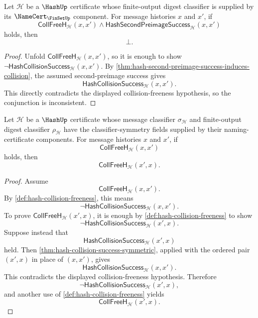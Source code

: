\begin{theorem}
\label{thm:hash-collision-freeness-excludes-second-preimage}
Let $\mathcal H$ be a $\HashUp$ certificate whose finite-output digest classifier is supplied by its $\NameCert_{\FinSetUp}$ component. For message histories $x$ and $x'$, if
$$
\mathsf{CollFreeH}_{\mathcal H}(x,x') \land \mathsf{HashSecondPreimageSuccess}_{\mathcal H}(x,x')
$$
holds, then
$$
\bot.
$$
\end{theorem}
\begin{proof}
Unfold $\mathsf{CollFreeH}_{\mathcal H}(x,x')$, so it is enough to show $\neg\mathsf{HashCollisionSuccess}_{\mathcal H}(x,x')$.
By \autoref{thm:hash-second-preimage-success-induces-collision}, the assumed second-preimage success gives
$$
\mathsf{HashCollisionSuccess}_{\mathcal H}(x,x').
$$
This directly contradicts the displayed collision-freeness hypothesis, so the conjunction is inconsistent.
\end{proof}

\begin{theorem}
\label{thm:hash-collision-freeness-symmetric}
Let $\mathcal H$ be a $\HashUp$ certificate whose message classifier $\sigma_{\mathcal H}$ and finite-output digest classifier $\rho_{\mathcal H}$ have the classifier-symmetry fields supplied by their naming-certificate components. For message histories $x$ and $x'$, if
$$
\mathsf{CollFreeH}_{\mathcal H}(x,x')
$$
holds, then
$$
\mathsf{CollFreeH}_{\mathcal H}(x',x).
$$
\end{theorem}
\begin{proof}
Assume
$$
\mathsf{CollFreeH}_{\mathcal H}(x,x').
$$
By \autoref{def:hash-collision-freeness}, this means
$$
\neg\mathsf{HashCollisionSuccess}_{\mathcal H}(x,x').
$$
To prove $\mathsf{CollFreeH}_{\mathcal H}(x',x)$, it is enough by \autoref{def:hash-collision-freeness} to show
$$
\neg\mathsf{HashCollisionSuccess}_{\mathcal H}(x',x).
$$
Suppose instead that
$$
\mathsf{HashCollisionSuccess}_{\mathcal H}(x',x)
$$
held. Then \autoref{thm:hash-collision-success-symmetric}, applied with the ordered pair $(x',x)$ in place of $(x,x')$, gives
$$
\mathsf{HashCollisionSuccess}_{\mathcal H}(x,x').
$$
This contradicts the displayed collision-freeness hypothesis. Therefore
$$
\neg\mathsf{HashCollisionSuccess}_{\mathcal H}(x',x),
$$
and another use of \autoref{def:hash-collision-freeness} yields
$$
\mathsf{CollFreeH}_{\mathcal H}(x',x).
$$
\end{proof}

